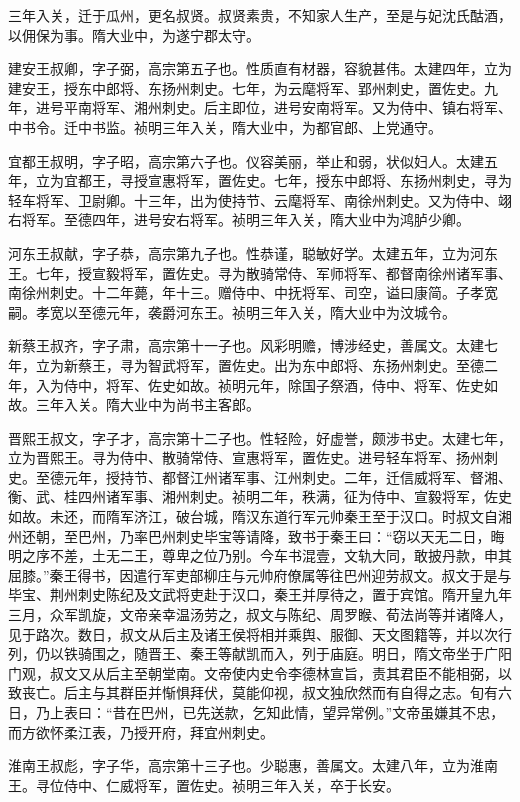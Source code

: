 \documentclass[]{article}
\begin{document}
三年入关，迁于瓜州，更名叔贤。叔贤素贵，不知家人生产，至是与妃沈氏酤酒，以佣保为事。隋大业中，为遂宁郡太守。

建安王叔卿，字子弼，高宗第五子也。性质直有材器，容貌甚伟。太建四年，立为建安王，授东中郎将、东扬州刺史。七年，为云麾将军、郢州刺史，置佐史。九年，进号平南将军、湘州刺史。后主即位，进号安南将军。又为侍中、镇右将军、中书令。迁中书监。祯明三年入关，隋大业中，为都官郎、上党通守。

宜都王叔明，字子昭，高宗第六子也。仪容美丽，举止和弱，状似妇人。太建五年，立为宜都王，寻授宣惠将军，置佐史。七年，授东中郎将、东扬州刺史，寻为轻车将军、卫尉卿。十三年，出为使持节、云麾将军、南徐州刺史。又为侍中、翊右将军。至德四年，进号安右将军。祯明三年入关，隋大业中为鸿胪少卿。

河东王叔献，字子恭，高宗第九子也。性恭谨，聪敏好学。太建五年，立为河东王。七年，授宣毅将军，置佐史。寻为散骑常侍、军师将军、都督南徐州诸军事、南徐州刺史。十二年薨，年十三。赠侍中、中抚将军、司空，谥曰康简。子孝宽嗣。孝宽以至德元年，袭爵河东王。祯明三年入关，隋大业中为汶城令。

新蔡王叔齐，字子肃，高宗第十一子也。风彩明赡，博涉经史，善属文。太建七年，立为新蔡王，寻为智武将军，置佐史。出为东中郎将、东扬州刺史。至德二年，入为侍中，将军、佐史如故。祯明元年，除国子祭酒，侍中、将军、佐史如故。三年入关。隋大业中为尚书主客郎。

晋熙王叔文，字子才，高宗第十二子也。性轻险，好虚誉，颇涉书史。太建七年，立为晋熙王。寻为侍中、散骑常侍、宣惠将军，置佐史。进号轻车将军、扬州刺史。至德元年，授持节、都督江州诸军事、江州刺史。二年，迁信威将军、督湘、衡、武、桂四州诸军事、湘州刺史。祯明二年，秩满，征为侍中、宣毅将军，佐史如故。未还，而隋军济江，破台城，隋汉东道行军元帅秦王至于汉口。时叔文自湘州还朝，至巴州，乃率巴州刺史毕宝等请降，致书于秦王曰：``窃以天无二日，晦明之序不差，土无二王，尊卑之位乃别。今车书混壹，文轨大同，敢披丹款，申其屈膝。''秦王得书，因遣行军吏部柳庄与元帅府僚属等往巴州迎劳叔文。叔文于是与毕宝、荆州刺史陈纪及文武将吏赴于汉口，秦王并厚待之，置于宾馆。隋开皇九年三月，众军凯旋，文帝亲幸温汤劳之，叔文与陈纪、周罗睺、荀法尚等并诸降人，见于路次。数日，叔文从后主及诸王侯将相并乘舆、服御、天文图籍等，并以次行列，仍以铁骑围之，随晋王、秦王等献凯而入，列于庙庭。明日，隋文帝坐于广阳门观，叔文又从后主至朝堂南。文帝使内史令李德林宣旨，责其君臣不能相弼，以致丧亡。后主与其群臣并惭惧拜伏，莫能仰视，叔文独欣然而有自得之志。旬有六日，乃上表曰：``昔在巴州，已先送款，乞知此情，望异常例。''文帝虽嫌其不忠，而方欲怀柔江表，乃授开府，拜宜州刺史。

淮南王叔彪，字子华，高宗第十三子也。少聪惠，善属文。太建八年，立为淮南王。寻位侍中、仁威将军，置佐史。祯明三年入关，卒于长安。
\end{document}
